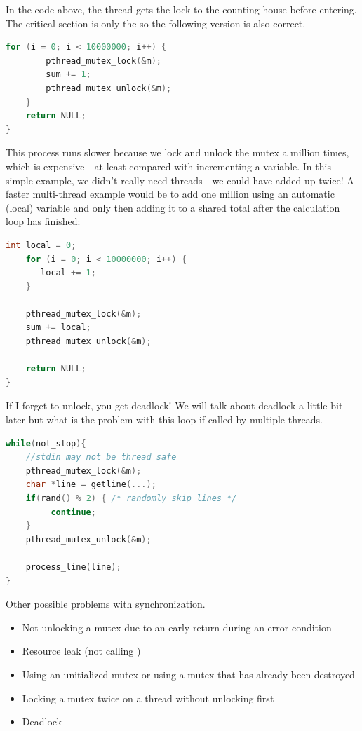 In the code above, the thread gets the lock to the counting house before entering.
The critical section is only the  so the following version is also correct.

\begin{lstlisting}[language=C]
    for (i = 0; i < 10000000; i++) {
        pthread_mutex_lock(&m);
        sum += 1;
        pthread_mutex_unlock(&m);
    }
    return NULL;
}
\end{lstlisting}

This process runs slower because we lock and unlock the mutex a million times, which is expensive - at least compared with incrementing a variable.
In this simple example, we didn't really need threads - we could have added up twice!
A faster multi-thread example would be to add one million using an automatic (local) variable and only then adding it to a shared total after the calculation loop has finished:

\begin{lstlisting}[language=C]
    int local = 0;
    for (i = 0; i < 10000000; i++) {
       local += 1;
    }

    pthread_mutex_lock(&m);
    sum += local;
    pthread_mutex_unlock(&m);

    return NULL;
}
\end{lstlisting}

If I forget to unlock, you get deadlock!
We will talk about deadlock a little bit later but what is the problem with this loop if called by multiple threads.

\begin{lstlisting}[language=C]
while(not_stop){
    //stdin may not be thread safe
    pthread_mutex_lock(&m);
    char *line = getline(...);
    if(rand() % 2) { /* randomly skip lines */
         continue;
    }
    pthread_mutex_unlock(&m);
    
    process_line(line);
}
\end{lstlisting}

Other possible problems with synchronization.

\begin{itemize}
\tightlist
\item
  Not unlocking a mutex due to an early return during an error condition
\item
  Resource leak (not calling )
\item
  Using an unitialized mutex or using a mutex that has already been destroyed
\item
  Locking a mutex twice on a thread without unlocking first
\item
  Deadlock
\end{itemize}

